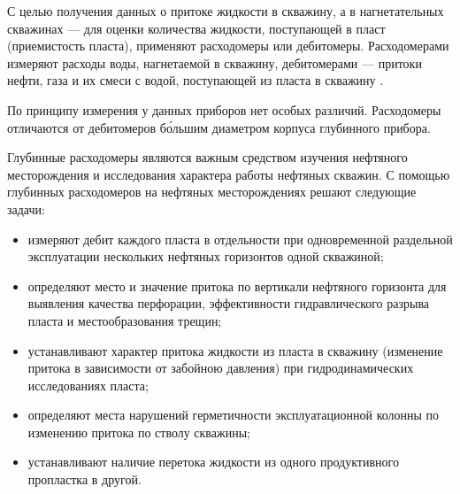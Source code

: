 
С целью получения данных о притоке жидкости в скважину, а в нагнетательных скважинах --- для оценки количества жидкости, поступающей в пласт (приемистость пласта), применяют расходомеры или дебитомеры. Расходомерами измеряют расходы воды, нагнетаемой в скважину, дебитомерами --- притоки нефти, газа и их смеси с водой, поступающей из пласта в скважину \cite{debit}.

По принципу измерения у данных приборов нет особых различий. Расходомеры отличаются от дебитомеров б\'ольшим диаметром корпуса глубинного прибора.

Глубинные расходомеры являются важным средством изучения нефтяного месторождения и исследования характера работы нефтяных скважин. С помощью глубинных расходомеров на нефтяных месторождениях решают следующие задачи:
\begin{itemize}
    \item измеряют дебит каждого пласта в отдельности при одновременной раздельной эксплуатации нескольких нефтяных горизонтов одной скважиной;
    \item определяют место и значение притока по вертикали нефтяного горизонта для выявления качества перфорации, эффективности гидравлического разрыва пласта и местообразования трещин;
    \item устанавливают характер притока жидкости из пласта в скважину (изменение притока в зависимости от забойною давления) при гидродинамических исследованиях пласта;
    \item определяют места нарушений герметичности эксплуатационной колонны по изменению притока по стволу скважины; 
    \item устанавливают наличие перетока жидкости из одного продуктивного пропластка в другой.
\end{itemize}

\clearpage
